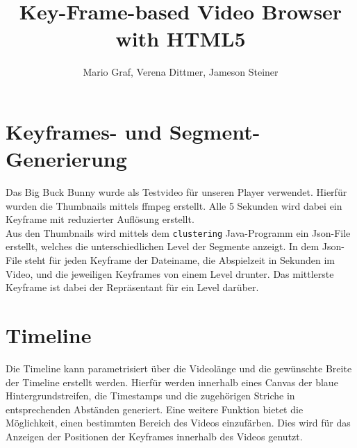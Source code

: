 \documentclass[a4paper,11pt,german]{scrartcl}
\title{Key-Frame-based Video Browser with HTML5}
\author{Mario Graf, Verena Dittmer, Jameson Steiner}
\begin{document}
\maketitle

\section*{Keyframes- und Segment-Generierung}
Das Big Buck Bunny wurde als Testvideo für unseren Player verwendet. Hierfür wurden die Thumbnails mittels ffmpeg erstellt. Alle 5 Sekunden wird dabei ein Keyframe mit reduzierter Auflösung erstellt. \\
Aus den Thumbnails wird mittels dem \texttt{clustering} Java-Programm ein Json-File erstellt, welches die unterschiedlichen Level der Segmente anzeigt. In dem Json-File steht für jeden Keyframe der Dateiname, die Abspielzeit in Sekunden im Video, und die jeweiligen Keyframes von einem Level drunter. Das mittlerste Keyframe ist dabei der Repräsentant für ein Level darüber.

\section*{Timeline}
Die Timeline kann parametrisiert über die Videolänge und die gewünschte Breite der Timeline erstellt werden. Hierfür werden innerhalb eines Canvas der blaue Hintergrundstreifen, die Timestamps und die zugehörigen Striche in entsprechenden Abständen generiert. Eine weitere Funktion bietet die Möglichkeit, einen bestimmten Bereich des Videos einzufärben. Dies wird für das Anzeigen der Positionen der Keyframes innerhalb des Videos genutzt.

\end{document}
